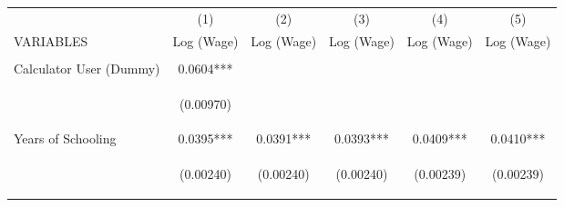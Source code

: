 \begin{center}
\begin{tabular}{lccccc} \hline
 & (1) & (2) & (3) & (4) & (5) \\
VARIABLES & Log (Wage) & Log (Wage) & Log (Wage) & Log (Wage) & Log (Wage) \\ \hline
\vspace{4pt} & \begin{footnotesize}\end{footnotesize} & \begin{footnotesize}\end{footnotesize} & \begin{footnotesize}\end{footnotesize} & \begin{footnotesize}\end{footnotesize} & \begin{footnotesize}\end{footnotesize} \\
Calculator User (Dummy) & 0.0604*** &  &  &  &  \\
\vspace{4pt} & \begin{footnotesize}(0.00970)\end{footnotesize} & \begin{footnotesize}\end{footnotesize} & \begin{footnotesize}\end{footnotesize} & \begin{footnotesize}\end{footnotesize} & \begin{footnotesize}\end{footnotesize} \\
Years of Schooling & 0.0395*** & 0.0391*** & 0.0393*** & 0.0409*** & 0.0410*** \\
\vspace{4pt} & \begin{footnotesize}(0.00240)\end{footnotesize} & \begin{footnotesize}(0.00240)\end{footnotesize} & \begin{footnotesize}(0.00240)\end{footnotesize} & \begin{footnotesize}(0.00239)\end{footnotesize} & \begin{footnotesize}(0.00239)\end{footnotesize} \\

\end{tabular}
\end{center}
